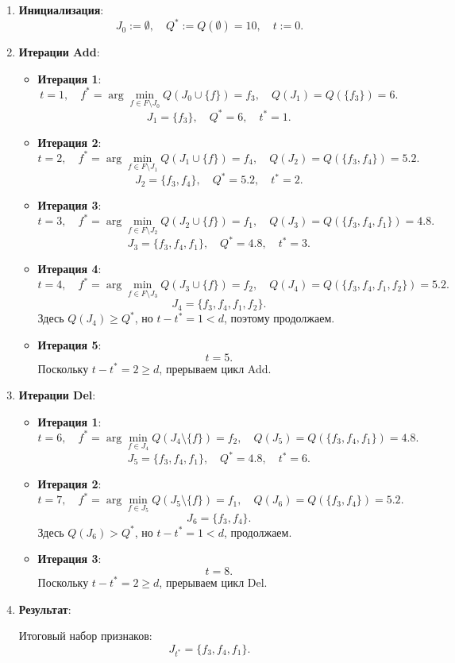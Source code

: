 \begin{enumerate}


\item \textbf{Инициализация}:
\[
J_0 := \emptyset, \quad Q^* := Q(\emptyset) = 10, \quad t := 0.
\]

\item \textbf{Итерации Add}:
\begin{itemize}
    \item \textbf{Итерация 1}: 
    \[
    t = 1, \quad f^* = \arg \min_{f \in F \setminus J_0} Q(J_0 \cup \{f\}) = f_3, \quad Q(J_1) = Q(\{f_3\}) = 6.
    \]
    \[
    J_1 = \{f_3\}, \quad Q^* = 6, \quad t^* = 1.
    \]

    \item \textbf{Итерация 2}: 
    \[
    t = 2, \quad f^* = \arg \min_{f \in F \setminus J_1} Q(J_1 \cup \{f\}) = f_4, \quad Q(J_2) = Q(\{f_3, f_4\}) = 5.2.
    \]
    \[
    J_2 = \{f_3, f_4\}, \quad Q^* = 5.2, \quad t^* = 2.
    \]

    \item \textbf{Итерация 3}: 
    \[
    t = 3, \quad f^* = \arg \min_{f \in F \setminus J_2} Q(J_2 \cup \{f\}) = f_1, \quad Q(J_3) = Q(\{f_3, f_4, f_1\}) = 4.8.
    \]
    \[
    J_3 = \{f_3, f_4, f_1\}, \quad Q^* = 4.8, \quad t^* = 3.
    \]

    \item \textbf{Итерация 4}: 
    \[
    t = 4, \quad f^* = \arg \min_{f \in F \setminus J_3} Q(J_3 \cup \{f\}) = f_2, \quad Q(J_4) = Q(\{f_3, f_4, f_1, f_2\}) = 5.2.
    \]
    \[
    J_4 = \{f_3, f_4, f_1, f_2\}.
    \]
    Здесь \( Q(J_4) \geq Q^* \), но \( t - t^* = 1 < d \), поэтому продолжаем.

    \item \textbf{Итерация 5}: 
    \[
    t = 5.
    \]
    Поскольку \( t - t^* = 2 \geq d \), прерываем цикл Add.
\end{itemize}

\item \textbf{Итерации Del}:
\begin{itemize}
    \item \textbf{Итерация 1}: 
    \[
    t = 6, \quad f^* = \arg \min_{f \in J_4} Q(J_4 \setminus \{f\}) = f_2, \quad Q(J_5) = Q(\{f_3, f_4, f_1\}) = 4.8.
    \]
    \[
    J_5 = \{f_3, f_4, f_1\}, \quad Q^* = 4.8, \quad t^* = 6.
    \]

    \item \textbf{Итерация 2}: 
    \[
    t = 7, \quad f^* = \arg \min_{f \in J_5} Q(J_5 \setminus \{f\}) = f_1, \quad Q(J_6) = Q(\{f_3, f_4\}) = 5.2.
    \]
    \[
    J_6 = \{f_3, f_4\}.
    \]
    Здесь \( Q(J_6) > Q^* \), но \( t - t^* = 1 < d \), продолжаем.

    \item \textbf{Итерация 3}: 
    \[
    t = 8.
    \]
    Поскольку \( t - t^* = 2 \geq d \), прерываем цикл Del.
\end{itemize}

\item \textbf{Результат}:

Итоговый набор признаков:
\[
J_{t^*} = \{f_3, f_4, f_1\}.
\]

\end{enumerate}

